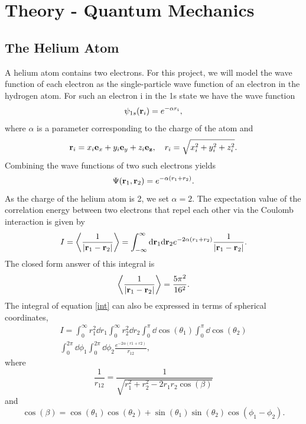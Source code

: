 \documentclass[notitlepage, reprint, nofootinbib]{revtex4-1}
\begin{document}
\section{Theory - Quantum Mechanics}
\subsection{The Helium Atom}
A helium atom contains two electrons. For this project, we will model the wave function of each electron as the single-particle wave function of an electron in the hydrogen atom. For such an electron i in the 1s state we have the wave function 
$$\psi_{1s}(\vb{r}_i)=e^{-\alpha r_i}, $$
where $\alpha$ is a parameter corresponding to the charge of the atom and 
$$\vb{r}_i=x_i\vb{e}_x+y_i\vb{e}_y+z_i\vb{e_z}, \quad r_i=\sqrt{x_i^2+y_i^2+z_i^2}.$$ 
Combining the wave functions of two such electrons yields 
$$\Psi(\vb{r}_1,\vb{r}_2) = e^{-\alpha(r_1+r_2)}.$$
As the charge of the helium atom is 2, we set $\alpha=2$. The expectation value of the correlation energy between two electrons that repel each other via the Coulomb interaction is given by 
\begin{equation}\label{int}I=\expval{\frac{1}{|\vb{r}_1-\vb{r}_2|}}=\int_{-\infty}^{\infty}\dd \vb{r}_1\dd \vb{r}_2 e^{-2\alpha(r_1+r_2)}\frac{1}{|\vb{r}_1-\vb{r}_2|}.\end{equation} 
The closed form answer of this integral is
\begin{equation}\label{int_ans}\expval{\frac{1}{|\vb{r}_1-\vb{r}_2|}}=\frac{5\pi^2}{16^2}.\end{equation}
The integral of equation \ref{int} can also be expressed in terms of spherical coordinates, 
\begin{align}
	I=\int_0^\infty r_1^2\dd r_1\int_0^\infty r_2^2\dd r_2 \int_0^\pi \dd\cos(\theta_1)\int_0^\pi\dd\cos(\theta_2)\nonumber\\
	\int_0^{2\pi}\dd\phi_1\int_0^{2\pi}\dd\phi_2\frac{e^{-2\alpha(r1+r2)}}{r_12},\label{spheric_int}
\end{align}
where 
$$\frac{1}{r_{12}}=\frac{1}{\sqrt{r_1^2 + r_2^2 -2r_1r_2\cos(\beta)}}$$
and 
$$\cos(\beta)=\cos(\theta_1)\cos(\theta_2)+\sin(\theta_1)\sin(\theta_2)\cos(\phi_1-\phi_2).$$
\newpage
\end{document}
